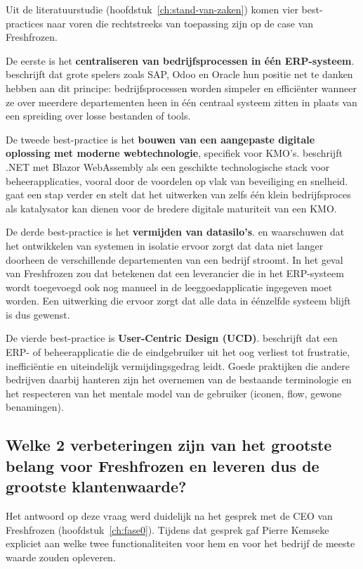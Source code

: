 Uit de literatuurstudie (hoofdstuk~\ref{ch:stand-van-zaken}) komen vier best-practices naar voren die rechtstreeks van toepassing zijn op de case van Freshfrozen.

De eerste is het \textbf{centraliseren van bedrijfsprocessen in één ERP-systeem}. \textcite{Sarferaz2025} beschrijft dat grote spelers zoals SAP, Odoo en Oracle hun positie net te danken hebben aan dit principe: bedrijfsprocessen worden simpeler en efficiënter wanneer ze over meerdere departementen heen in één centraal systeem zitten in plaats van een spreiding over losse bestanden of tools.

De tweede best-practice is het \textbf{bouwen van een aangepaste digitale oplossing met moderne webtechnologie}, specifiek voor KMO's. \textcite{Machado2023} beschrijft .NET met Blazor WebAssembly als een geschikte technologische stack voor beheerapplicaties, vooral door de voordelen op vlak van beveiliging en snelheid. \textcite{Amaro2025} gaat een stap verder en stelt dat het uitwerken van zelfs één klein bedrijfsproces als katalysator kan dienen voor de bredere digitale maturiteit van een KMO.

De derde best-practice is het \textbf{vermijden van datasilo's}. \textcite{Rahman2025} en \textcite{JeleelOjuade2024} waarschuwen dat het ontwikkelen van systemen in isolatie ervoor zorgt dat data niet langer doorheen de verschillende departementen van een bedrijf stroomt. In het geval van Freshfrozen zou dat betekenen dat een leverancier die in het ERP-systeem wordt toegevoegd ook nog manueel in de leeggoedapplicatie ingegeven moet worden. Een uitwerking die ervoor zorgt dat alle data in éénzelfde systeem blijft is dus gewenst.

De vierde best-practice is \textbf{User-Centric Design (UCD)}. \textcite{Rahman2025} beschrijft dat een ERP- of beheerapplicatie die de eindgebruiker uit het oog verliest tot frustratie, inefficiëntie en uiteindelijk vermijdingsgedrag leidt. Goede praktijken die andere bedrijven daarbij hanteren zijn het overnemen van de bestaande terminologie en het respecteren van het mentale model van de gebruiker (iconen, flow, gewone benamingen).

\subsection{Welke 2 verbeteringen zijn van het grootste belang voor Freshfrozen en leveren dus de grootste klantenwaarde?}

Het antwoord op deze vraag werd duidelijk na het gesprek met de CEO van Freshfrozen (hoofdstuk~\ref{ch:fase0}). Tijdens dat gesprek gaf Pierre Kemseke expliciet aan welke twee functionaliteiten voor hem en voor het bedrijf de meeste waarde zouden opleveren.

